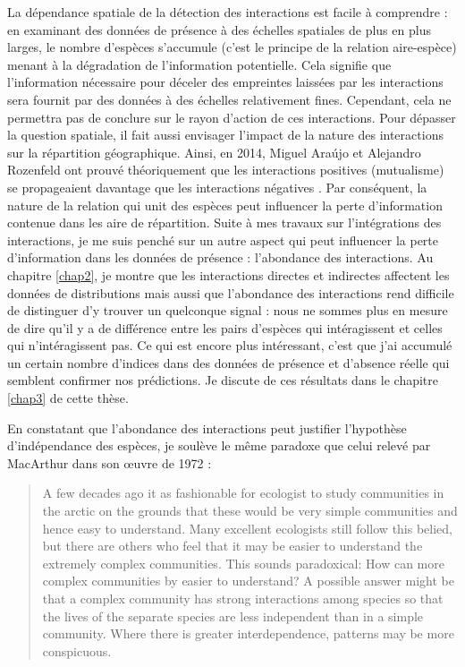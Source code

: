 La dépendance spatiale de la détection des interactions est facile à
comprendre : en examinant des données de présence à des échelles
spatiales de plus en plus larges, le nombre d'espèces s'accumule (c'est
le principe de la relation aire-espèce) menant à la dégradation de
l'information potentielle. Cela signifie que l'information nécessaire
pour déceler des empreintes laissées par les interactions sera fournit
par des données à des échelles relativement fines. Cependant, cela ne
permettra pas de conclure sur le rayon d'action de ces interactions.
Pour dépasser la question spatiale, il fait aussi envisager l'impact de
la nature des interactions sur la répartition géographique. Ainsi, en
2014, Miguel Araújo et Alejandro Rozenfeld ont prouvé théoriquement que
les interactions positives (mutualisme) se propageaient davantage que
les interactions négatives \citep{Araujo2014}. Par conséquent, la nature
de la relation qui unit des espèces peut influencer la perte
d'information contenue dans les aire de répartition. Suite à mes travaux
sur l'intégrations des interactions, je me suis penché sur un autre
aspect qui peut influencer la perte d'information dans les données de
présence : l'abondance des interactions. Au chapitre \ref{chap2}, je
montre que les interactions directes et indirectes affectent les données
de distributions mais aussi que l'abondance des interactions rend
difficile de distinguer d'y trouver un quelconque signal : nous ne
sommes plus en mesure de dire qu'il y a de différence entre les pairs
d'espèces qui intéragissent et celles qui n'intéragissent pas. Ce qui
est encore plus intéressant, c'est que j'ai accumulé un certain nombre
d'indices dans des données de présence et d'absence réelle qui semblent
confirmer nos prédictions. Je discute de ces résultats dans le chapitre
\ref{chap3} de cette thèse.

En constatant que l'abondance des interactions peut justifier
l'hypothèse d'indépendance des espèces, je soulève le même paradoxe que
celui relevé par MacArthur dans son œuvre de 1972
\citep{macarthur1972geographical} :

\begin{quote}
A few decades ago it as fashionable for ecologist to study communities
in the arctic on the grounds that these would be very simple communities
and hence easy to understand. Many excellent ecologists still follow
this belied, but there are others who feel that it may be easier to
understand the extremely complex communities. This sounds paradoxical:
How can more complex communities by easier to understand? A possible
answer might be that a complex community has strong interactions among
species so that the lives of the separate species are less independent
than in a simple community. Where there is greater interdependence,
patterns may be more conspicuous.
\end{quote}

